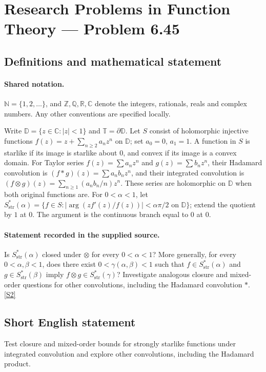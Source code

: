 \documentclass[11pt]{article}
\newcommand{\sref}[2]{\hyperlink{source:#1:#2}{[S#2]}}
\begin{document}
\section{Research Problems in Function Theory — Problem 6.45}\label{statement}

\subsection{Definitions and mathematical statement}

\paragraph{Shared notation.}$\mathbb N=\{1,2,\ldots\}$, and $\mathbb Z,\mathbb Q,\mathbb R,\mathbb C$ denote the integers, rationals, reals and complex numbers. Any other conventions are specified locally.


Write $\mathbb D=\{z\in\mathbb C:|z|<1\}$ and $\mathbb T=\partial\mathbb D$. Let $S$ consist of holomorphic injective functions $f(z)=z+\sum_{n\ge2}a_nz^n$ on $\mathbb D$; set $a_0=0$, $a_1=1$. A function in $S$ is starlike if its image is starlike about $0$, and convex if its image is a convex domain. For Taylor series $f(z)=\sum a_nz^n$ and $g(z)=\sum b_nz^n$, their Hadamard convolution is $(f*g)(z)=\sum a_nb_nz^n$, and their integrated convolution is $(f\otimes g)(z)=\sum_{n\ge1}(a_nb_n/n)z^n$. These series are holomorphic on $\mathbb D$ when both original functions are. For $0<\alpha<1$, let $S^*_{\mathrm{str}}(\alpha)=\{f\in S:|\arg(zf'(z)/f(z))|<\alpha\pi/2\text{ on }\mathbb D\}$; extend the quotient by $1$ at $0$. The argument is the continuous branch equal to $0$ at $0$.
\paragraph{Statement recorded in the supplied source.}
Is $S^*_{\mathrm{str}}(\alpha)$ closed under $\otimes$ for every $0<\alpha<1$? More generally, for every $0<\alpha,\beta<1$, does there exist $0<\gamma(\alpha,\beta)<1$ such that $f\in S^*_{\mathrm{str}}(\alpha)$ and $g\in S^*_{\mathrm{str}}(\beta)$ imply $f\otimes g\in S^*_{\mathrm{str}}(\gamma)$? Investigate analogous closure and mixed-order questions for other convolutions, including the Hadamard convolution $*$. \sref{statement}{2}
\subsection{Short English statement}
Test closure and mixed-order bounds for strongly starlike functions under integrated convolution and explore other convolutions, including the Hadamard product.
\end{document}
